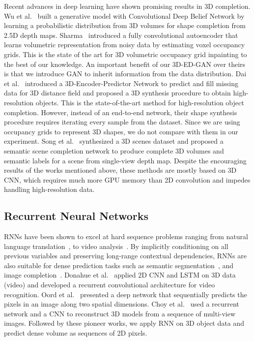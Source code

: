 \documentclass[10pt,twocolumn,letterpaper]{article}
\begin{document}
Recent advances in deep learning have shown promising results in 3D completion. Wu et al.~\cite{modelnet} built a generative model with Convolutional Deep Belief Network by learning a probabilistic distribution from 3D volumes for shape completion from 2.5D depth maps. Sharma~\cite{vconvdae} introduced a fully convolutional autoencoder that learns volumetric representation from noisy data by estimating voxel occupancy grids. This is the state of the art for 3D volumetric occupancy grid inpainting to the best of our knowledge. An important benefit of our 3D-ED-GAN over theirs is that we introduce GAN to inherit information from the data distribution. Dai et al.~\cite{3depn} introduced a 3D-Encoder-Predictor Network to predict and fill missing data for 3D distance field and proposed a 3D synthesis procedure to obtain high-resolution objects. This is the state-of-the-art method for high-resolution object completion. However, instead of an end-to-end network, their shape synthesis procedure requires iterating every sample from the dataset. Since we are using occupancy grids to represent 3D shapes, we do not compare with them in our experiment. Song et al.~\cite{ssn} synthesized a 3D scenes dataset and proposed a semantic scene completion network to produce complete 3D volumes and semantic labels for a scene from single-view depth map.  Despite the encouraging results of the works mentioned above, these methods are mostly based on 3D CNN, which requires much more GPU memory than 2D convolution and impedes handling high-resolution data. 

\subsection{Recurrent Neural Networks}
RNNs have been shown to excel at hard sequence problems ranging from natural language translation~\cite{recurrenttranslation}, to video analysis~\cite{LRCNvideo}. By implicitly conditioning on all previous variables and preserving long-range contextual dependencies, RNNs are also suitable for dense prediction tasks such as semantic segmentation~\cite{reseg,scenelabelinglstm}, and image completion~\cite{pixelrnn}. Donahue et al.~\cite{LRCNvideo} applied 2D CNN and LSTM on 3D data (video) and developed a recurrent convolutional architecture for video recognition. Oord et al.~\cite{pixelrnn} presented a deep network that sequentially predicts the pixels in an image along two spatial dimensions. Choy et al.~\cite{r2n2} used a recurrent network and a CNN to reconstruct 3D models from a sequence of multi-view images. Followed by these pioneer works, we apply RNN on 3D object data and predict dense volume as sequences of 2D pixels. 
\end{document}
